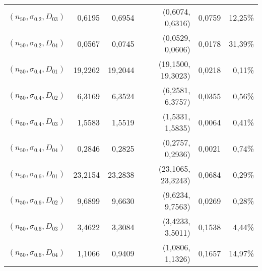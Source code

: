 \documentclass[preprint,12pt]{elsarticle}
\begin{document}
\begin{table}[htbp]
\begin{tabular}{rrrrrr}
$(n_{50},\sigma_{0.2},D_{03})$ & 0,6195 & 0,6954 & (0,6074, 0,6316) & 0,0759 & 12,25\% \\
$(n_{50},\sigma_{0.2},D_{04})$ & 0,0567 & 0,0745 & (0,0529, 0,0606) & 0,0178 & 31,39\% \\
$(n_{50},\sigma_{0.4},D_{01})$ & 19,2262 & 19,2044 & (19,1500, 19,3023) & 0,0218 & 0,11\% \\
$(n_{50},\sigma_{0.4},D_{02})$ & 6,3169 & 6,3524 & (6,2581, 6,3757) & 0,0355 & 0,56\% \\
$(n_{50},\sigma_{0.4},D_{03})$ & 1,5583 & 1,5519 & (1,5331, 1,5835) & 0,0064 & 0,41\% \\
$(n_{50},\sigma_{0.4},D_{04})$ & 0,2846 & 0,2825 & (0,2757, 0,2936) & 0,0021 & 0,74\% \\
$(n_{50},\sigma_{0.6},D_{01})$ & 23,2154 & 23,2838 & (23,1065, 23,3243) & 0,0684 & 0,29\% \\
$(n_{50},\sigma_{0.6},D_{02})$ & 9,6899 & 9,6630 & (9,6234, 9,7563) & 0,0269 & 0,28\% \\
$(n_{50},\sigma_{0.6},D_{03})$& 3,4622 & 3,3084 & (3,4233, 3,5011) & 0,1538 & 4,44\% \\
$(n_{50},\sigma_{0.6},D_{04})$& 1,1066 & 0,9409 & (1,0806, 1,1326) & 0,1657 & 14,97\% \\
    \bottomrule
    \end{tabular}%
  \label{tab:addlabel}%
\end{table}%
\end{document}

